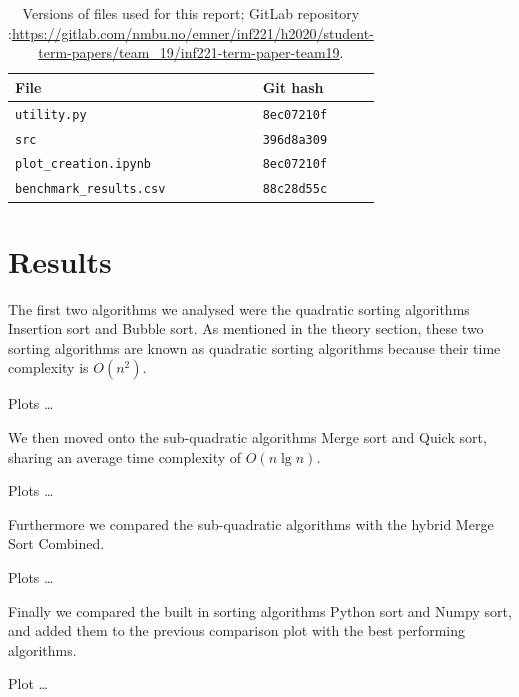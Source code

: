 \documentclass[sigconf, nonacm, natbib, screen, balance=False]{acmart}
\begin{document}
\begin{table}
  \caption{Versions of files used for this report; GitLab repository :\url{https://gitlab.com/nmbu.no/emner/inf221/h2020/student-term-papers/team_19/inf221-term-paper-team19}.}
  \label{tab:hashes}
  \begin{tabular}{ll}
    \hline
    File & Git hash \\\hline
    \verb!utility.py! & \verb!8ec07210f! \\
    \verb!src! & \verb!396d8a309! \\
    \verb!plot_creation.ipynb! & \verb!8ec07210f! \\
    \verb!benchmark_results.csv! & \verb!88c28d55c! \\\hline
  \end{tabular}
\end{table}

\section{Results}\label{sec:results}

The first two algorithms we analysed were the quadratic sorting algorithms Insertion sort and Bubble sort. As mentioned in the theory section, these two sorting algorithms are known as quadratic sorting algorithms because their time complexity is $O(n^2)$.
 
Plots \dots

We then moved onto the sub-quadratic algorithms Merge sort and Quick sort, sharing an average time complexity of $O(n\lg n)$. 

Plots \dots

Furthermore we compared the sub-quadratic algorithms with the hybrid Merge Sort Combined.

Plots \dots

Finally we compared the built in sorting algorithms Python sort and Numpy sort, and added them to the previous comparison plot with the best performing algorithms. 

Plot \dots
\end{document}
